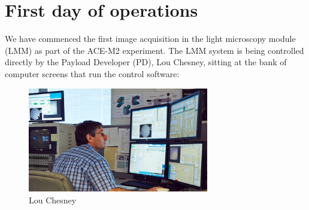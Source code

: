 \section{First day of operations}\label{first-day-of-operations}
We have commenced the first image acquisition in the light microscopy module (LMM) as part of the ACE-M2 experiment. The LMM system is being controlled directly by the Payload Developer (PD), Lou Chesney, sitting at the bank of computer screens that run the control software:
\begin{figure}[h]
\begin{center}
\includegraphics[width=3.1in]{./images/2014_06_04_first_day/140604_ace_tsc_chestney_lou_web.jpg}
\end{center}
\caption{Lou Chesney}
\end{figure}

